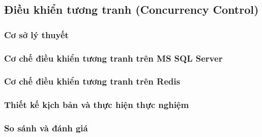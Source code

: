 \subsection{Điều khiển tương tranh (Concurrency Control)}
\label{subsec:concurrency-control}

\subsubsection{Cơ sở lý thuyết}

\subsubsection{Cơ chế điều khiển tương tranh trên MS SQL Server}

\subsubsection{Cơ chế điều khiển tương tranh trên Redis}

\subsubsection{Thiết kế kịch bản và thực hiện thực nghiệm}

\subsubsection{So sánh và đánh giá}
